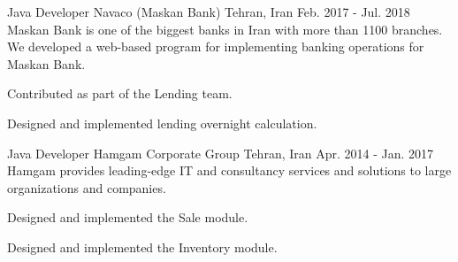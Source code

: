 \begin{cventries}
  \cventry
    {Java Developer} %
    {Navaco (Maskan Bank)} %
    {Tehran, Iran} %
    {Feb. 2017 - Jul. 2018} %
    {
      Maskan Bank is one of the biggest banks in Iran with more than 1100 branches. We developed a web-based program for implementing banking operations for Maskan Bank.
    }
    {
      \begin{cvitems} %
        \item {Contributed as part of the Lending team.}
        \item {Designed and implemented lending overnight calculation.}
      \end{cvitems}
    }

  \cventry
    {Java Developer} %
    {Hamgam Corporate Group} %
    {Tehran, Iran} %
    {Apr. 2014 - Jan. 2017} %
    {
      Hamgam provides leading-edge IT and consultancy services and solutions to large organizations and companies.
    }
    {
      \begin{cvitems} %
        \item {Designed and implemented the Sale module.}
        \item {Designed and implemented the Inventory module.}
      \end{cvitems}
    }

\end{cventries}
